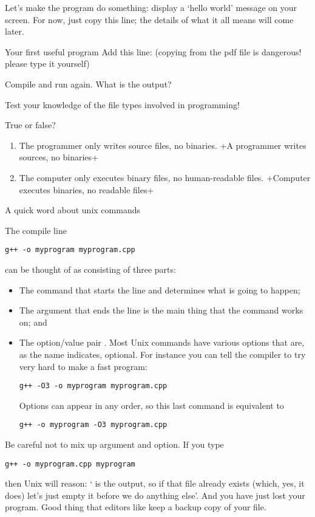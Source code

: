Let's make the program do something:
display a `hello world' message on your screen.
For now, just copy this line; the details
of what it all means will come later.

\begin{exercise}{Your first useful program}
  \label{ex:sayhello}
Add this line:
%
%
(copying from the pdf file is dangerous! please type it yourself)

Compile and run again. What is the output? 
\end{exercise}

Test your knowledge of the file types involved in programming!

\begin{review}
  \label{q:compiler}
  True or false?
  \begin{enumerate}
  \item The programmer only writes source files, no binaries.
    \slackpollTF+A programmer writes sources, no binaries+
  \item The computer only executes binary files, no human-readable files.
    \slackpollTF+Computer executes binaries, no readable files+
  \end{enumerate}
\end{review}

 {A quick word about unix commands}

The compile line
\begin{verbatim}
g++ -o myprogram myprogram.cpp
\end{verbatim}
can be thought of as consisting of three parts:
\begin{itemize}
\item The command  that starts the line and determines what is
  going to happen;
\item The argument  that ends the line is the main
  thing that the command works on; and
\item The option/value pair . Most Unix commands have
  various options that are, as the name indicates, optional. For
  instance you can tell the compiler to try very hard to make a fast program:
\begin{verbatim}
g++ -O3 -o myprogram myprogram.cpp
\end{verbatim}
  Options can appear in any order, so this last command is equivalent to
\begin{verbatim}
g++ -o myprogram -O3 myprogram.cpp
\end{verbatim}
\end{itemize}
Be careful not to mix up argument and option. If you type
\begin{verbatim}
g++ -o myprogram.cpp myprogram
\end{verbatim}
then Unix will reason: ` is the output, so if that
file already exists (which, yes, it does) let's just empty it before
we do anything else'. And you have just lost your program.
Good thing that editors like
 keep a backup copy of your file.

